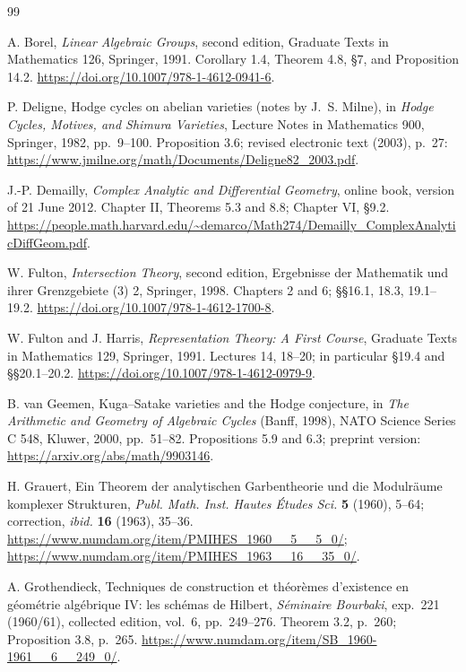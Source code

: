 \begin{thebibliography}{99}

A. Borel,
\emph{Linear Algebraic Groups}, second edition,
Graduate Texts in Mathematics 126, Springer, 1991.
Corollary 1.4, Theorem 4.8, \S7, and Proposition 14.2.
\url{https://doi.org/10.1007/978-1-4612-0941-6}.

P. Deligne,
Hodge cycles on abelian varieties (notes by J.~S. Milne),
in \emph{Hodge Cycles, Motives, and Shimura Varieties},
Lecture Notes in Mathematics 900, Springer, 1982, pp.~9--100.
Proposition 3.6; revised electronic text (2003), p.~27:
\url{https://www.jmilne.org/math/Documents/Deligne82_2003.pdf}.

J.-P. Demailly,
\emph{Complex Analytic and Differential Geometry},
online book, version of 21 June 2012.
Chapter II, Theorems 5.3 and 8.8; Chapter VI, \S9.2.
\url{https://people.math.harvard.edu/~demarco/Math274/Demailly_ComplexAnalyticDiffGeom.pdf}.

W. Fulton,
\emph{Intersection Theory}, second edition,
Ergebnisse der Mathematik und ihrer Grenzgebiete (3) 2,
Springer, 1998.
Chapters 2 and 6; \S\S16.1, 18.3, 19.1--19.2.
\url{https://doi.org/10.1007/978-1-4612-1700-8}.

W. Fulton and J. Harris,
\emph{Representation Theory: A First Course},
Graduate Texts in Mathematics 129, Springer, 1991.
Lectures 14, 18--20; in particular \S19.4 and \S\S20.1--20.2.
\url{https://doi.org/10.1007/978-1-4612-0979-9}.

B. van Geemen,
Kuga--Satake varieties and the Hodge conjecture,
in \emph{The Arithmetic and Geometry of Algebraic Cycles}
(Banff, 1998), NATO Science Series C 548,
Kluwer, 2000, pp.~51--82.
Propositions 5.9 and 6.3; preprint version:
\url{https://arxiv.org/abs/math/9903146}.

H. Grauert,
Ein Theorem der analytischen Garbentheorie und die Modulr\"aume
komplexer Strukturen,
\emph{Publ. Math. Inst. Hautes \'Etudes Sci.} \textbf{5} (1960), 5--64;
correction, \emph{ibid.} \textbf{16} (1963), 35--36.
\url{https://www.numdam.org/item/PMIHES_1960__5__5_0/};
\url{https://www.numdam.org/item/PMIHES_1963__16__35_0/}.

A. Grothendieck,
Techniques de construction et th\'eor\`emes d'existence en g\'eom\'etrie
alg\'ebrique IV: les sch\'emas de Hilbert,
\emph{S\'eminaire Bourbaki}, exp.~221 (1960/61),
collected edition, vol.~6, pp.~249--276.
Theorem 3.2, p.~260; Proposition 3.8, p.~265.
\url{https://www.numdam.org/item/SB_1960-1961__6__249_0/}.


\end{thebibliography}
